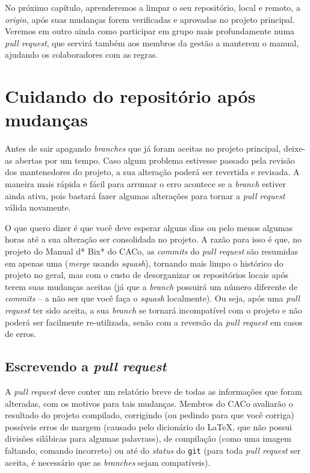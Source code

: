 \documentclass[a4paper,oneside,10pt]{memoir}
\begin{document}
No próximo capítulo, aprenderemos a limpar o seu repositório, local e remoto,
a \emph{origin}, após suas mudanças forem verificadas e aprovadas no projeto
principal. Veremos em outro ainda como participar em grupo mais profundamente
numa \emph{pull request}, que servirá também aos membros da gestão a manterem o
manual, ajudando os colaboradores com as regras.


\chapter{Cuidando do repositório após mudanças}

Antes de sair apagando \emph{branches} que já foram aceitas no projeto
principal, deixe-as abertas por um tempo. Caso algum problema estivesse passado
pela revisão dos mantenedores do projeto, a sua alteração poderá ser revertida
e revisada. A maneira mais rápida e fácil para arrumar o erro acontece se a
\emph{branch} estiver ainda ativa, pois bastará fazer algumas alterações para
tornar a \emph{pull request} válida novamente.

O que quero dizer é que você deve esperar alguns dias ou pelo menos algumas
horas até a sua alteração ser consolidada no projeto. A razão para isso é que,
no projeto do Manual d* Bix* do CACo, as \emph{commits} do \emph{pull request}
são resumidas em apenas uma (\emph{merge} usando \emph{squash}), tornando mais
limpo o histórico do projeto no geral, mas com o custo de desorganizar os
repositórios locais após terem suas mudanças aceitas (já que a \emph{branch}
possuirá um número diferente de \emph{commits} -- a não ser que você faça o
\emph{squash} localmente). Ou seja, após uma \emph{pull request} ter sido
aceita, a sua \emph{branch} se tornará incompatível com o projeto e não poderá
ser facilmente re-utilizada, senão com a reversão da \emph{pull request} em
casos de erros.

\section{Escrevendo a \emph{pull request}}

A \emph{pull request} deve conter um relatório breve de todas as informações que
foram alteradas, com os motivos para tais mudanças. Membros do CACo avaliarão o
resultado do projeto compilado, corrigindo (ou pedindo para que você corriga)
possíveis erros de margem (causado pelo dicionário do \LaTeX, que não possui
divisões silábicas para algumas palavrass), de compilação (como uma imagem
faltando, comando incorreto) ou até do \emph{status} do \texttt{git} (para toda
\emph{pull request} ser aceita, é necessário que as \emph{branches} sejam
compatíveis).
\end{document}
